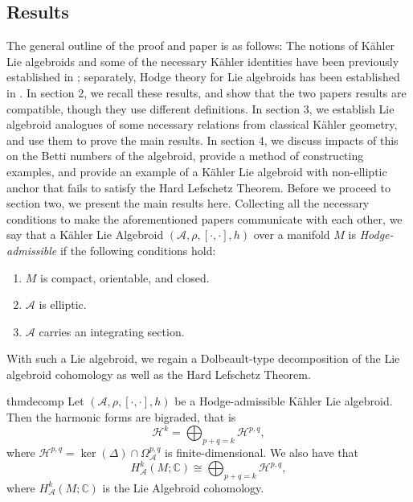 \documentclass{amsart}
\newcommand{\C}{\mathbb{C}}
\theoremstyle{definition}
\newcommand{\A}{\mathcal{A}}
\theoremstyle{definition}
\begin{document}
\subsection{Results}
 The general outline of the proof and paper is as follows: The notions of Kähler Lie algebroids and some of the necessary Kähler identities have been previously established in \cite{MR4722602}; separately, Hodge theory for Lie algebroids has been established in \cite{MR4377306}. In section 2, we recall these results, and show that the two papers results are compatible, though they use different definitions. In section 3, we establish Lie algebroid analogues of some necessary relations from classical Kähler geometry, and use them to prove the main results. In section 4, we discuss impacts of this on the Betti numbers of the algebroid, provide a method of constructing examples, and provide an example of a Kähler Lie algebroid with non-elliptic anchor that fails to satisfy the Hard Lefschetz Theorem. Before we proceed to section two, we present the main results here. Collecting all the necessary conditions to make the aforementioned papers communicate with each other, we say that a K\"ahler Lie Algebroid $(\A,\rho ,[\cdot , \cdot], h)$ over a manifold $M$ is \textit{Hodge-admissible} if the following conditions hold:
    \begin{enumerate}
        \item $M$ is compact, orientable, and closed.
        \item $\A$ is elliptic.
        \item $\A$ carries an integrating section.
    \end{enumerate}
With such a Lie algebroid, we regain a Dolbeault-type decomposition of the Lie algebroid cohomology as well as the Hard Lefschetz Theorem.
\begin{restatable}{thm}{decomp}
     Let $(\A,\rho, [ \cdot, \cdot],h)$ be a Hodge-admissible K\"ahler Lie algebroid. Then the harmonic forms are bigraded, that is
    \begin{equation*}
        \mathcal{H}^k = \bigoplus_{p+q=k}\mathcal{H}^{p,q},
    \end{equation*}
    where $\mathcal{H}^{p,q} = \ker(\Delta) \cap\Omega_\A^{p,q}$ is finite-dimensional. We also have that
    \begin{equation*}
        H_\A^k(M;\C) \cong \bigoplus_{p+q=k} \mathcal{H}^{p,q},
    \end{equation*}
    where $H_\A^k(M;\C)$ is the Lie Algebroid cohomology.
\end{restatable}
\end{document}
